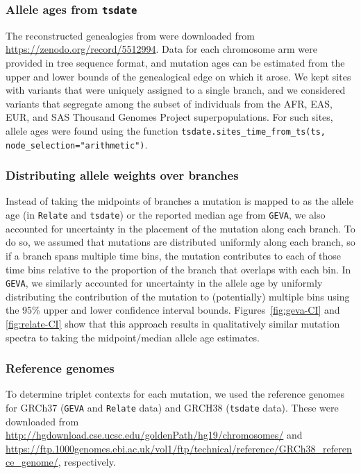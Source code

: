 \documentclass[]{article}
\newcommand{\GEVA}{\texttt{GEVA}\xspace}
\newcommand{\tsdate}{\texttt{tsdate}\xspace}
\newcommand{\relate}{\texttt{Relate}\xspace}
\begin{document}
\subsubsection*{Allele ages from \tsdate}

The reconstructed genealogies from \citet{wohns2022unified} were downloaded
from \url{https://zenodo.org/record/5512994}. Data for each chromosome arm were
provided in tree sequence format, and mutation ages can be estimated from the
upper and lower bounds of the genealogical edge on which it arose. We kept
sites with variants that were uniquely assigned to a single branch, and we
considered variants that segregate among the subset of individuals from the
AFR, EAS, EUR, and SAS Thousand Genomes Project superpopulations. For such
sites, allele ages were found using the function
\texttt{tsdate.sites\_time\_from\_ts(ts, node\_selection="arithmetic")}.

\subsubsection*{Distributing allele weights over branches}

Instead of taking the midpoints of branches a mutation is mapped to as the
allele age (in \relate and \tsdate) or the reported median age from \GEVA, we
also accounted for uncertainty in the placement of the mutation along each
branch. To do so, we assumed that mutations are distributed uniformly along
each branch, so if a branch spans multiple time bins, the mutation contributes
to each of those time bins relative to the proportion of the branch that
overlaps with each bin. In \GEVA, we similarly accounted for uncertainty in the
allele age by uniformly distributing the contribution of the mutation to
(potentially) multiple bins using the 95\% upper and lower confidence interval
bounds. Figures~\ref{fig:geva-CI} and \ref{fig:relate-CI} show that this approach
results in qualitatively similar mutation spectra to taking the midpoint/median
allele age estimates.

\subsubsection*{Reference genomes} To determine triplet contexts for each
mutation, we used the reference genomes for GRCh37 (\GEVA and \relate data) and
GRCH38 (\tsdate data). These were downloaded from
\url{http://hgdownload.cse.ucsc.edu/goldenPath/hg19/chromosomes/} and
\url{https://ftp.1000genomes.ebi.ac.uk/vol1/ftp/technical/reference/GRCh38_reference_genome/},
respectively.
\end{document}
